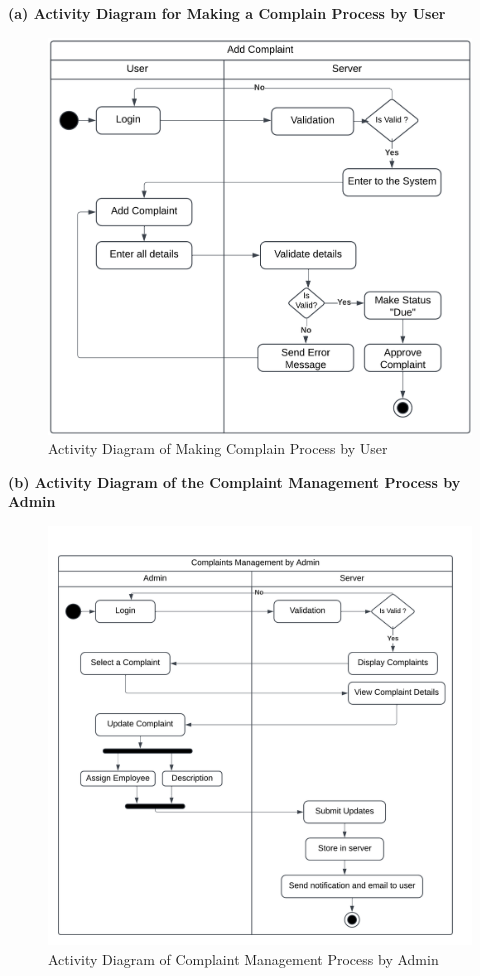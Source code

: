 \documentclass[a4paper,12pt]{article}
\begin{document}
\noindent\textbf{(a) Activity Diagram for Making a Complain Process by User}
\begin{figure}[H]
    \centering
    \includegraphics[width=1\linewidth]{photos/add-complain-activity-diagram.png}

    \caption{Activity Diagram of Making Complain Process by User}
    \label{fig:enter-label}
\end{figure}

\noindent\textbf{(b) Activity Diagram of the Complaint Management Process by Admin}
\begin{figure}[H]
    \centering
    \includegraphics[width=1\linewidth]{photos/complaint-management-activity-diagram.png}

    \caption{Activity Diagram of Complaint Management Process by Admin}
    \label{fig:enter-label}
\end{figure}
\end{document}
